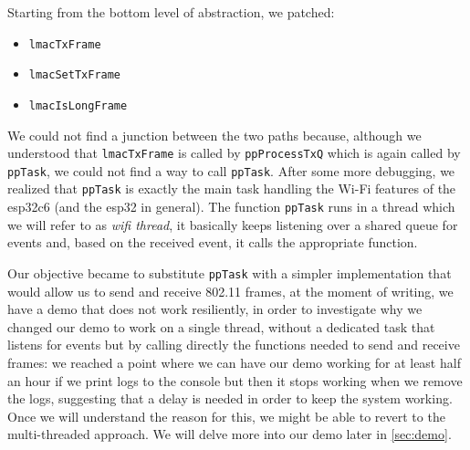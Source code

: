 Starting from the bottom level of abstraction, we patched:
\begin{itemize}
\item \texttt{lmacTxFrame}
\item \texttt{lmacSetTxFrame}
\item \texttt{lmacIsLongFrame}
\end{itemize}
We could not find a junction between the two paths because,
although we understood that \texttt{lmacTxFrame} is called 
by \texttt{ppProcessTxQ} which is again called by \texttt{ppTask},
we could not find a way to call \texttt{ppTask}.
After some more debugging, we realized that \texttt{ppTask} is
exactly the main task handling the Wi-Fi features of the esp32c6
(and the esp32 in general).
The function \texttt{ppTask} runs in a thread which we will refer
to as \textit{wifi thread}, it basically keeps listening over
a shared queue for events and, based on the received event, it
calls the appropriate function.

Our objective became to substitute \texttt{ppTask} with a simpler implementation
that would allow us to send and receive 802.11 frames, at the moment of writing,
we have a demo that does not work resiliently, in order to investigate why 
we changed our demo to work on a single thread, without a dedicated
task that listens for events but by calling directly the functions needed 
to send and receive frames: we reached a point where we can have our demo
working for at least half an hour if we print logs to the console but 
then it stops working when we remove the logs, suggesting that a delay is
needed in order to keep the system working.
Once we will understand the reason for this, we might be able to revert
to the multi-threaded approach.
We will delve more into our demo later in \ref{sec:demo}.


